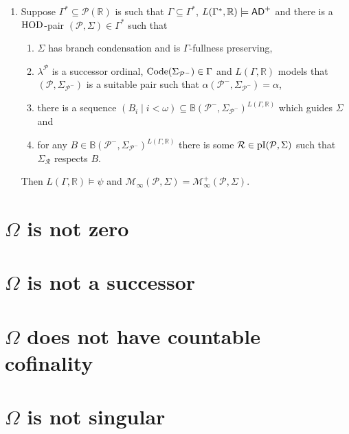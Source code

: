 \documentclass[../../main]{subfiles}
\begin{document}
{\begin{enumerate}
    \item Suppose $\Gamma^{*} \subseteq \mathcal{P}(\mathbb{R})$ is such that $\Gamma \subseteq \Gamma^{*}$, $L(\Gamma^{*}, \mathbb{R}) \models \textsf{AD}^{+}$ and there is a $\operatorname{HOD}$-pair $(\mathcal{P}, \Sigma) \in \Gamma^{*}$ such that
      \begin{enumerate}
        \item $\Sigma$ has branch condensation and is $\Gamma$-fullness preserving,
        \item $\lambda^{\mathcal{P}}$ is a successor ordinal, $\operatorname{Code}(\Sigma_{\mathcal{P}^{-}}) \in \Gamma$ and $L(\Gamma, \mathbb{R})$ models that $(\mathcal{P}, \Sigma_{\mathcal{P}^{-}})$ is a suitable pair such that $\alpha(\mathcal{P}^{-}, \Sigma_{\mathcal{P}^{-}}) = \alpha$, 
        \item there is a sequence $(B_{i} \mid i < \omega) \subseteq \mathbb{B}(\mathcal{P}^{-}, \Sigma_{\mathcal{P}^{-}})^{L(\Gamma, \mathbb{R})}$ which guides $\Sigma$ and 
        \item for any $B \in \mathbb{B}(\mathcal{P}^{-}, \Sigma_{\mathcal{P}^{-}})^{L(\Gamma, \mathbb{R})}$ there is some $\mathcal{R} \in \operatorname{pI}(\mathcal{P}, \Sigma)$ such that $\Sigma_{\mathcal{R}}$ respects $B$. 
      \end{enumerate}

      Then $L(\Gamma, \mathbb{R}) \models \psi$ and $\mathcal{M}_{\infty}(\mathcal{P}, \Sigma) = \mathcal{M}^{+}_{\infty}(\mathcal{P}, \Sigma)$.
  \end{enumerate}
}


\section{$\Omega$ is not zero}
\lipsum[1]

\section{$\Omega$ is not a successor}
\lipsum[1]

\section{$\Omega$ does not have countable cofinality}
\lipsum[1]

\section{$\Omega$ is not singular}
\lipsum[1]
\end{document}
